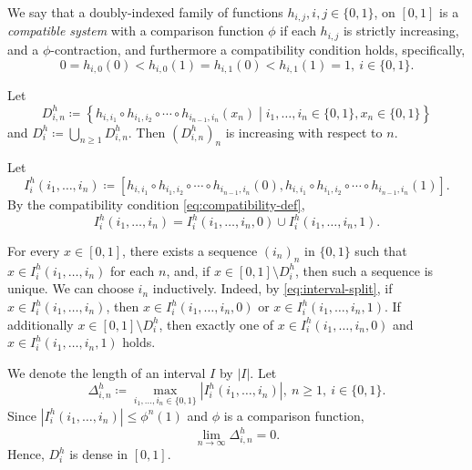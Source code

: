 \documentclass[a4paper, reqno, 11pt]{amsart}
\theoremstyle{definition}
\begin{document}
We say that a doubly-indexed family of functions  $h_{i,j}, i, j \in \{0,1\}$, on $[0,1]$ is a {\it compatible system} with a comparison function $\phi$ 
if each $h_{i,j}$ is strictly increasing, and a $\phi$-contraction, and furthermore a compatibility condition holds, specifically, 
\begin{equation}\label{eq:compatibility-def} 
0 = h_{i,0} (0) < h_{i,0}(1) = h_{i,1}(0) < h_{i,1}(1) = 1, \ i \in \{0,1\}. 
\end{equation} 

Let 
\[ D^h_{i, n}  \coloneqq \left\{  h_{i,i_1} \circ h_{i_1,i_2} \circ \cdots \circ h_{i_{n-1},i_n} (x_n) \middle| i_1, \dots, i_n \in \{0,1\}, x_n \in \{0,1\}  \right\} \]
and $\displaystyle D^h_{i} \coloneqq \bigcup_{n \ge 1} D^h_{i, n}$. 
Then $(D^h_{i, n})_n$ is increasing with respect to $n$. 

Let 
\[ I^h_{i} (i_1, \dots, i_n)  \coloneqq \left[ h_{i,i_1} \circ h_{i_1,i_2} \circ \cdots \circ h_{i_{n-1},i_n} (0), h_{i,i_1} \circ h_{i_1,i_2} \circ \cdots \circ h_{i_{n-1},i_n} (1) \right]. \]
By the compatibility condition \eqref{eq:compatibility-def}, 
\begin{equation}\label{eq:interval-split} 
I^h_{i} (i_1, \dots, i_n) = I^h_{i} (i_1, \dots, i_n,0) \cup I^h_{i} (i_1, \dots, i_n,1). 
\end{equation}


For every $x \in [0,1]$, 
there exists a sequence $(i_n)_n$ in $\{0,1\}$ such that 
$x \in  I^h_{i} (i_1, \dots, i_n)$ for each $n$, and, if $x \in [0,1] \setminus  D^h_{i}$, then such a sequence is unique. 
We can choose $i_n$ inductively. 
Indeed, by \eqref{eq:interval-split}, 
if $x \in  I^h_{i} (i_1, \dots, i_n)$, then $x \in  I^h_{i} (i_1, \dots, i_n, 0)$ or $x \in  I^h_{i} (i_1, \dots, i_n, 1)$.
If additionally $x \in [0,1] \setminus  D^h_{i}$, then exactly one of $x \in  I^h_{i} (i_1, \dots, i_n, 0)$ and $x \in  I^h_{i} (i_1, \dots, i_n, 1)$ holds. 



We denote the length of an interval $I$ by $|I|$. 
Let 
\[ \Delta^{h}_{i, n} \coloneqq \max_{i_1, \dots, i_n \in \{0,1\}}  \left| I^h_{i} (i_1, \dots, i_n) \right|, \ n \ge 1, \  i \in \{0,1\}.  \]
Since $\left| I^h_{i} (i_1, \dots, i_n) \right| \le \phi^n (1)$ and $\phi$ is a comparison function, 
\begin{equation}\label{eq:interval-shrink} 
\lim_{n \to \infty} \Delta^{h}_{i, n} = 0. 
\end{equation}
Hence, $D^h_{i}$ is dense in $[0,1]$. 
\end{document}
